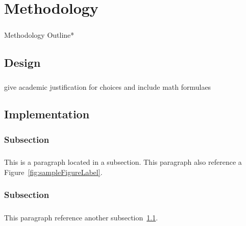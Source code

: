 \chapter{Methodology}
\label{chap:chapter1}

\paragraph{}Methodology Outline*

\section{Design}
\label{sec:section1}
\paragraph{}

\paragraph{}give academic justification for choices and include math formulaes
\section{Implementation}
\label{sec:section2}

\subsection{Subsection} 
\label{ssec:subsection1}


\paragraph{}This is a paragraph located in a subsection.  This paragraph also reference a  Figure~\ref{fig:sampleFigureLabel}.


\subsection{Subsection}
\label{ssec:subsection2}

\paragraph{}This paragraph reference another subsection~\ref{sec:section1}.

